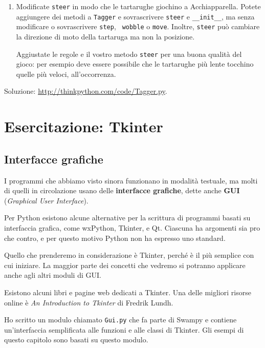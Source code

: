 \documentclass[10pt]{book}
\begin{document}
\begin{exercise}
\begin{enumerate}
\item Modificate {\tt steer} in modo che le tartarughe giochino a Acchiapparella. Potete aggiungere dei metodi a {\tt Tagger} e sovrascrivere {\tt steer} e
  \verb"__init__", ma senza modificare o sovrascrivere {\tt step}, {\tt
    wobble} o {\tt move}.  Inoltre, {\tt steer} può cambiare la direzione di moto della tartaruga ma non la posizione.

Aggiustate le regole e il vostro metodo {\tt steer} per una buona qualità del gioco: per esempio deve essere possibile che le tartarughe più lente tocchino quelle più veloci, all'occorrenza.

\end{enumerate}

Soluzione: \url{http://thinkpython.com/code/Tagger.py}.
\end{exercise}



\chapter{Esercitazione: Tkinter}
\label{tkinter}

\section{Interfacce grafiche}

I programmi che abbiamo visto sinora funzionano in modalità testuale, ma molti di quelli in circolazione usano delle {\bf interfacce grafiche}, dette anche {\bf GUI} ({\em Graphical User Interface}).

Per Python esistono alcune alternative per la scrittura di programmi basati su interfaccia grafica, come wxPython, Tkinter, e Qt. Ciascuna ha argomenti sia pro che contro, e per questo motivo Python non ha espresso uno standard.

Quello che prenderemo in considerazione è Tkinter, perché è il più semplice con cui iniziare. La maggior parte dei concetti che vedremo si potranno applicare anche agli altri moduli di GUI.

Esistono alcuni libri e pagine web dedicati a Tkinter. Una delle migliori risorse online è {\em An Introduction to Tkinter} di Fredrik Lundh.

Ho scritto un modulo chiamato {\tt Gui.py} che fa parte di Swampy e contiene un'interfaccia semplificata alle funzioni e alle classi di Tkinter. Gli esempi di questo capitolo sono basati su questo modulo.
\end{document}
